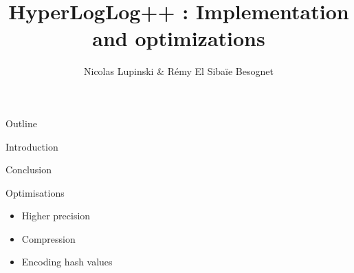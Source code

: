 \documentclass{beamer}
\title{HyperLogLog++ : Implementation and optimizations}
\author{Nicolas Lupinski \& Rémy El Sibaïe Besognet}
\begin{document}
\begin{frame}
  \titlepage  
\end{frame}

\begin{frame}{Outline}
  \tableofcontents
\end{frame}

\begin{frame}{Introduction}
\end{frame}
  


\begin{frame}{Conclusion}

  \begin{block}{Optimisations}
    \begin{itemize}
      \item Higher precision
      \item Compression
      \item Encoding hash values
    \end{itemize}
  \end{block}
\end{frame}
\end{document}
